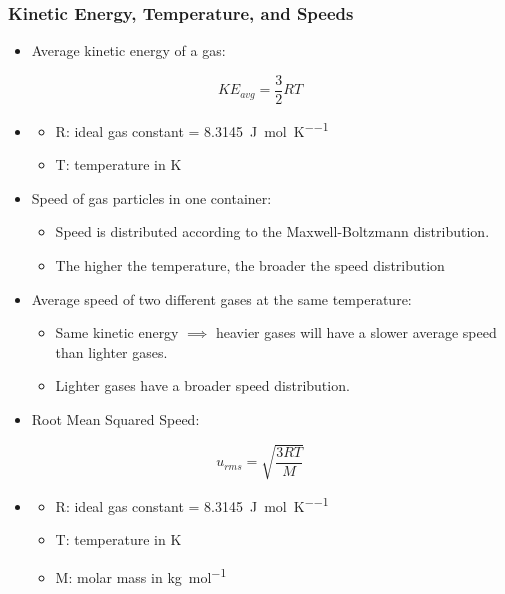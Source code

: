 \documentclass{article}
\begin{document}
\subsubsection{Kinetic Energy, Temperature, and Speeds}

\begin{itemize}
    \item Average kinetic energy of a gas:
\end{itemize}    

\begin{equation*}
    KE_{avg} = \frac{3}{2}RT
\end{equation*}

\begin{itemize}
    \item[] \begin{itemize}
        \item R: ideal gas constant = \SI[per-mode = fraction]{8.3145}{\joule\per\mole\per\kelvin}
        \item T: temperature in \si{\kelvin}
    \end{itemize}
    \item Speed of gas particles in one container:
    \begin{itemize}
        \item Speed is distributed according to the Maxwell-Boltzmann distribution.
        \item The higher the temperature, the broader the speed distribution
    \end{itemize}
    \item Average speed of two different gases at the same temperature:
    \begin{itemize}
        \item Same kinetic energy $\implies$ heavier gases will have a slower average speed than lighter gases.
        \item Lighter gases have a broader speed distribution.
    \end{itemize}
    \item Root Mean Squared Speed:
\end{itemize}

\begin{equation*}
    u_{rms} = \sqrt{\frac{3RT}{M}}
\end{equation*}

\begin{itemize}
    \item[] \begin{itemize}
        \item R: ideal gas constant = \SI[per-mode = fraction]{8.3145}{\joule\per\mole\per\kelvin}
        \item T: temperature in \si{\kelvin}
        \item M: molar mass in \si[per-mode = fraction]{\kilo\gram\per\mol}
    \end{itemize}
\end{itemize}
\end{document}

